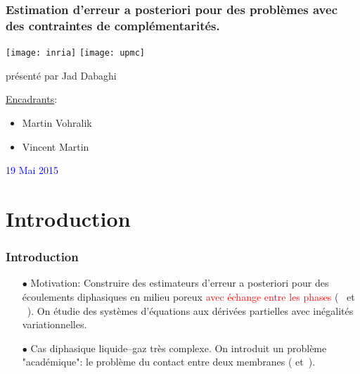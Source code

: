 \documentclass{beamer}
\begin{document}

\begin{frame}
\frametitle{Estimation d'erreur a posteriori pour des problèmes avec des contraintes de complémentarités.}
\texttt{[image: inria]}
\hspace{5 cm}
\texttt{[image: upmc]}
\vspace{0.6 cm}
\vspace{0.2 cm}
\begin{center}
présenté par Jad Dabaghi
\end{center}
\underline{Encadrants}: 
\begin{itemize}
\item  Martin Vohralik
\item  Vincent Martin
\end{itemize}
\vspace{-0.6 cm}
\hspace{8 cm}
\textcolor{blue}{19 Mai 2015}
\end{frame}
\tableofcontents

\setcounter{tocdepth}{4}
\section{Introduction}
\begin{frame}
\frametitle{Introduction}
\begin{itemize}
\item[$\bullet$]Motivation: Construire des estimateurs d'erreur a posteriori pour des écoulements diphasiques en milieu poreux \textcolor{red}{ avec échange entre les phases} (~\cite{Ben:2012} et ~\cite{BenJaff:2014}). On étudie des systèmes d'équations aux dérivées partielles avec inégalités variationnelles. 
\item[$\bullet$] Cas diphasique liquide--gaz très complexe. On introduit un problème "académique": le problème du contact entre deux membranes (\cite{VorBer:2008} et~\cite{VorBer:2012}).
\end{itemize}
\end{frame}
\end{document}
